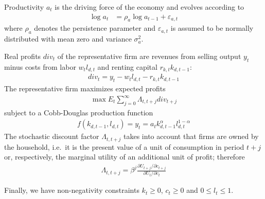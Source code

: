 Productivity \(a_t\) is the driving force of the economy and evolves according to
\begin{align*}
\log{a_{t}} &= \rho_a \log{a_{t-1}}  + \varepsilon_{a,t}
\end{align*}
where \(\rho_a\) denotes the persistence parameter and \(\varepsilon_{a,t}\) is assumed to be normally distributed with mean zero and variance \(\sigma_a^2\).
	
Real profits \({div}_t\) of the representative firm are revenues from selling output \(y_t\) minus costs from labor \(w_t l_{d,t}\) and renting capital \(r_{k,t} k_{d,t-1}\):
\begin{align*}
{div}_t = y_{t} - w_{t} l_{d,t} - r_{k,t} k_{d,t-1}
\end{align*}
The representative firm maximizes expected profits
\begin{align*}
	\max E_t \sum_{j=0}^{\infty} {\Lambda}_{t,t+j} {div}_{t+j}
\end{align*}
subject to a Cobb-Douglas production function
\begin{align*}
f(k_{d,t-1}, l_{d,t}) = y_t = a_t k_{d,t-1}^\alpha l_{d,t}^{1-\alpha}
\end{align*}
The stochastic discount factor \({\Lambda}_{t,t+j}\) takes into account that firms are owned by the household,
  i.e.\ it is the present value of a unit of consumption in period \(t+j\) or, respectively,
  the marginal utility of an additional unit of profit;
  therefore
\begin{align*}
\Lambda_{t,t+j}=\beta^j \frac{\partial U_{t+j}/\partial c_{t+j}}{\partial U_{t}/\partial c_{t}}
\end{align*}
	
Finally, we have non-negativity constraints	\(k_t \geq 0\), \(c_t \geq 0\) and \(0 \leq l_t \leq 1\).


